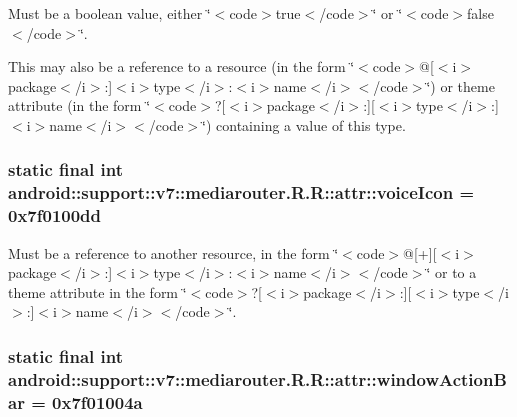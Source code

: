 Must be a boolean value, either \char`\"{}$<$code$>$true$<$/code$>$\char`\"{} or \char`\"{}$<$code$>$false$<$/code$>$\char`\"{}. 

This may also be a reference to a resource (in the form \char`\"{}$<$code$>$@\mbox{[}$<$i$>$package$<$/i$>$:\mbox{]}$<$i$>$type$<$/i$>$:$<$i$>$name$<$/i$>$$<$/code$>$\char`\"{}) or theme attribute (in the form \char`\"{}$<$code$>$?\mbox{[}$<$i$>$package$<$/i$>$:\mbox{]}\mbox{[}$<$i$>$type$<$/i$>$:\mbox{]}$<$i$>$name$<$/i$>$$<$/code$>$\char`\"{}) containing a value of this type. \hypertarget{classandroid_1_1support_1_1v7_1_1mediarouter_1_1_r_1_1attr_79633f25ee006bf3e29aca35611a1486}{
\subsubsection[{voiceIcon}]{\setlength{\rightskip}{0pt plus 5cm}static final int android::support::v7::mediarouter.R.R::attr::voiceIcon = 0x7f0100dd}}
\label{classandroid_1_1support_1_1v7_1_1mediarouter_1_1_r_1_1attr_79633f25ee006bf3e29aca35611a1486}


Must be a reference to another resource, in the form \char`\"{}$<$code$>$@\mbox{[}+\mbox{]}\mbox{[}$<$i$>$package$<$/i$>$:\mbox{]}$<$i$>$type$<$/i$>$:$<$i$>$name$<$/i$>$$<$/code$>$\char`\"{} or to a theme attribute in the form \char`\"{}$<$code$>$?\mbox{[}$<$i$>$package$<$/i$>$:\mbox{]}\mbox{[}$<$i$>$type$<$/i$>$:\mbox{]}$<$i$>$name$<$/i$>$$<$/code$>$\char`\"{}. \hypertarget{classandroid_1_1support_1_1v7_1_1mediarouter_1_1_r_1_1attr_781a69cf8612a3786bb5c3545e42c9a4}{
\subsubsection[{windowActionBar}]{\setlength{\rightskip}{0pt plus 5cm}static final int android::support::v7::mediarouter.R.R::attr::windowActionBar = 0x7f01004a}}
\label{classandroid_1_1support_1_1v7_1_1mediarouter_1_1_r_1_1attr_781a69cf8612a3786bb5c3545e42c9a4}


